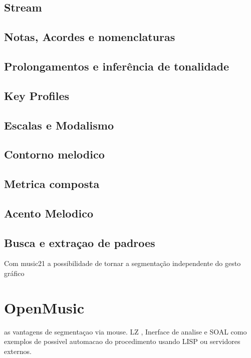 \documentclass[
	12pt,				%
	openright,			%
	twoside,			%
	a4paper,			%
	english,			%
	french,				%
	spanish,			%
	brazil				%
	]{abntex2}
\begin{document}
\subsection{Stream}


\subsection{Notas, Acordes e nomenclaturas}


\subsection{Prolongamentos e inferência de tonalidade}

\subsection{Key Profiles}

\subsection{Escalas e Modalismo}

\subsection{Contorno melodico}

\subsection{Metrica composta}

\subsection{Acento Melodico}

\subsection{Busca e extraçao de padroes}

Com music21 a possibilidade de tornar a segmentação independente do gesto gráfico

\section{OpenMusic}

as vantagens de segmentaçao via mouse. LZ , Inerface de analise e SOAL como exemplos de possivel automacao do procedimento usando LISP ou servidores externos.
\end{document}
